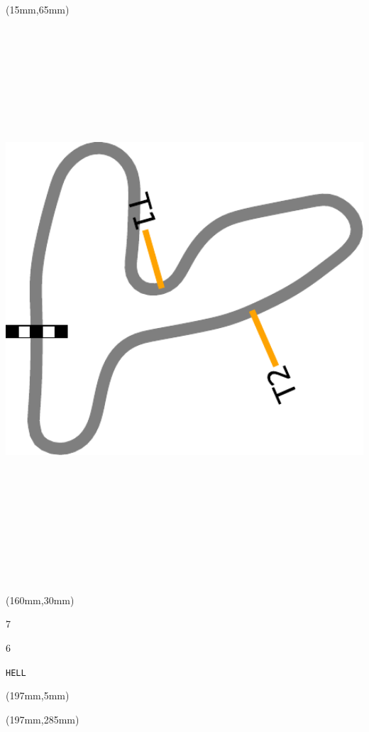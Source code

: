 \begin{textblock*}{185mm}(15mm,65mm)%
\centering
\mbox{\includegraphics[width=185mm,height=210mm,keepaspectratio]{PT/HELL.pdf}}
\end{textblock*}
\begin{textblock*}{40mm}(160mm,30mm)%
\Large
\par{} 
\par7 
\par6 
\par\hfill\tiny\tt HELL\\
\end{textblock*}
\begin{textblock*}{20mm}(197mm,5mm)%
\fbox{\thepage}
\label{HELL}
\end{textblock*}
\begin{textblock*}{20mm}(197mm,285mm)%
\fbox{\thepage}
\end{textblock*}

